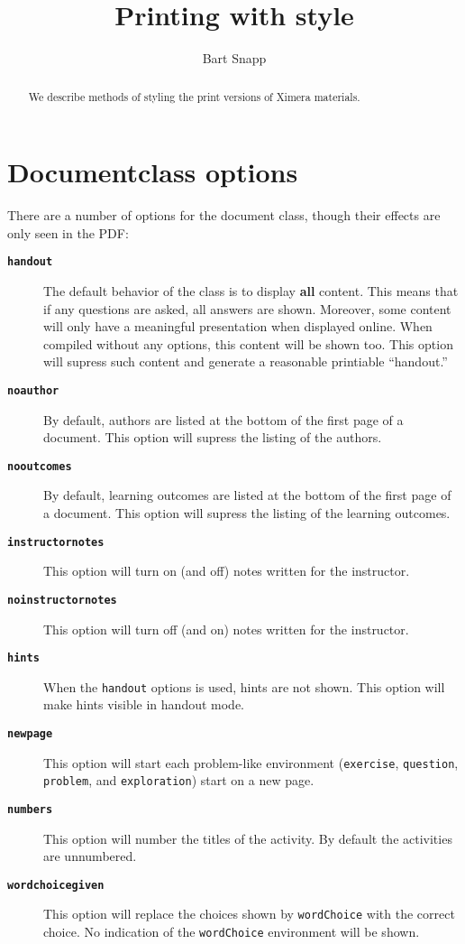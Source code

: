 \documentclass{ximera}
\title{Printing with style}
\author{Bart Snapp}
\begin{document}
\begin{abstract}
    We describe methods of styling the print versions of Ximera materials.
\end{abstract}
\maketitle

\section{Documentclass options}

There are a number of options for the document class, though their
effects are only seen in the PDF:

\begin{description}
    \item[\tt\bfseries handout] The default behavior of the class is to display
        \textbf{all} content. This means that if any questions are asked, all
        answers
        are shown. Moreover, some content will only have a meaningful
        presentation when
        displayed online. When compiled without any options, this content will
        be shown
        too. This option will supress such content and generate a reasonable
        printiable
        ``handout.''
    \item[\tt\bfseries noauthor] By default, authors are listed at the bottom
        of
        the first page of a document. This option will supress the listing of
        the
        authors.
    \item[\tt\bfseries nooutcomes] By default, learning outcomes are listed at
        the
        bottom of the first page of a document. This option will supress the
        listing of
        the learning outcomes.
    \item[\tt\bfseries instructornotes] This option will turn on (and off)
        notes
        written for the instructor.
    \item[\tt\bfseries noinstructornotes] This option will turn off (and on)
        notes
        written for the instructor.
    \item[\tt\bfseries hints] When the \texttt{handout} options is used, hints
        are
        not shown. This option will make hints visible in handout mode.
    \item[\tt\bfseries newpage] This option will start each problem-like
        environment (\texttt{exercise}, \texttt{question}, \texttt{problem},
        and
        \texttt{exploration}) start on a new page.
    \item[\tt\bfseries numbers] This option will number the titles of the
        activity.
        By default the activities are unnumbered.
    \item[\tt\bfseries wordchoicegiven] This option will replace the choices
        shown
        by \texttt{wordChoice} with the correct choice. No indication of the
        \texttt{wordChoice} environment will be shown.
\end{description}
\end{document}
